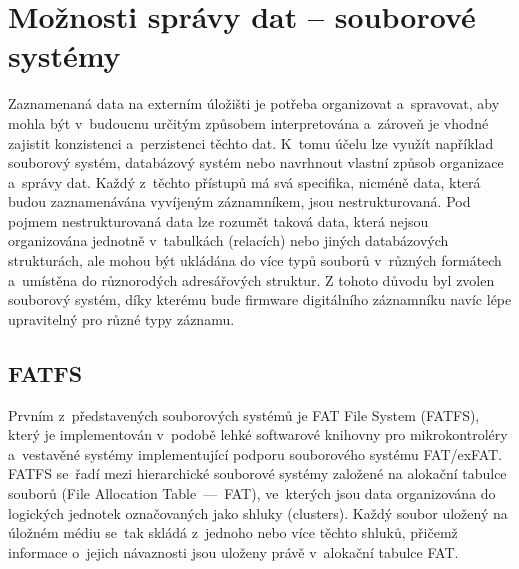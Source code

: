 



\section{Možnosti správy dat -- souborové systémy}
Zaznamenaná data na externím úložišti je potřeba organizovat a~spravovat, aby mohla být v~budoucnu určitým způsobem interpretována a~zároveň je vhodné zajistit konzistenci a~perzistenci těchto dat. K~tomu účelu lze využít například souborový systém, databázový systém nebo navrhnout vlastní způsob organizace a~správy dat. Každý z~těchto přístupů má svá specifika, nicméně data, která budou zaznamenávána vyvíjeným záznamníkem, jsou nestrukturovaná. Pod pojmem nestrukturovaná data lze rozumět taková data, která nejsou organizována jednotně v~tabulkách (relacích) nebo jiných databázových strukturách, ale mohou být ukládána do více typů souborů v~různých formátech a~umístěna do různorodých adresářových struktur. Z tohoto důvodu byl zvolen souborový systém, díky kterému bude firmware digitálního záznamníku navíc lépe upravitelný pro různé typy záznamu.~\cite{weka_structured_unstructured_data, virginia_tech_file_database_systems}

\subsection{FATFS}
\label{fatfs}
Prvním z~představených souborových systémů je FAT File System (FATFS), který je implementován v~podobě lehké softwarové knihovny pro mikrokontroléry a~vestavěné systémy implementující podporu souborového systému FAT/exFAT. FATFS se~řadí mezi hierarchické souborové systémy založené na alokační tabulce souborů (File Allocation Table~––~FAT), ve~kterých jsou data organizována do logických jednotek označovaných jako shluky (clusters). Každý soubor uložený na úložném médiu se~tak skládá z~jednoho nebo více těchto shluků, přičemž informace o~jejich návaznosti jsou uloženy právě v~alokační tabulce FAT.~\cite{elm_fat_filesystem_docs, recoverit_fat_filesystem}

